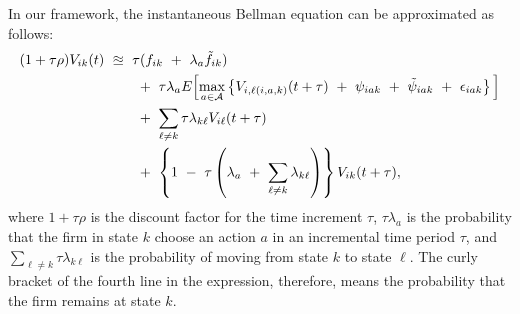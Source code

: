 In our framework, the instantaneous Bellman equation can be approximated as follows:
\begin{equation*}
\begin{split}
    (1 + \tau \rho) V_{ik} (t) \
    & \approxeq \ \tau (f_{ik} \ + \ \lambda_{a} \tilde{f}_{ik}) \\
    & \hspace{0.7cm} + \ \tau \lambda_{a} E\Big[ \underset{a \in \mathcal{A}}{\max} \left\{ V_{i,\ell(i, a, k)} (t + \tau) \ + \ \psi_{iak} \ + \ \tilde{\psi}_{iak} \ + \ \epsilon_{iak} \right\} \Big] \\
    & \hspace{0.7cm} + \ \sum_{\ell \neq k} \tau \lambda_{k\ell} V_{i\ell}(t + \tau) \\
    & \hspace{0.7cm} + \ \left\{ 1 \ - \ \tau \left( \lambda_{a} \ + \ \sum_{\ell \neq k} \lambda_{k\ell} \right) \right\} V_{ik} (t + \tau),
\end{split}
\end{equation*}
where $1 + \tau \rho$ is the discount factor for the time increment $\tau$, $\tau \lambda_{a}$ is the probability that the firm in state $k$ choose an action $a$ in an incremental time period $\tau$, and $\sum_{\ell \neq k} \tau \lambda_{k\ell}$ is the probability of moving from state $k$ to state $\ell$. The curly bracket of the fourth line in the expression, therefore, means the probability that the firm remains at state $k$. 

